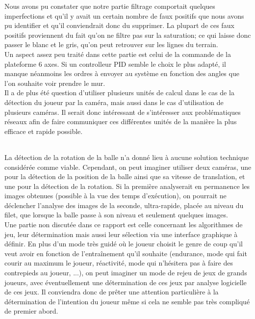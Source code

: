 Nous avons pu constater que notre partie filtrage comportait quelques imperfections et qu'il y avait un certain nombre de faux positifs que nous avons pu identifier et qu'il conviendrait donc du supprimer. La plupart de ces faux positifs proviennent du fait qu'on ne filtre pas sur la saturation; ce qui laisse donc passer le blanc et le gris, qu'on peut retrouver sur les lignes du terrain. \\

Un aspect assez peu traité dans cette partie est celui de la commande de la plateforme 6 axes. Si un controlleur PID semble le choix le plus adapté, il manque néanmoins les ordres à envoyer au système en fonction des angles que l'on souhaite voir prendre le mur. \\


Il a de plus été question d'utiliser plusieurs unités de calcul dans le cas de la détection du joueur par la caméra, mais aussi dans le cas d'utilisation de plusieurs caméras. Il serait donc intéressant de s'intéresser aux problématiques réseaux afin de faire communiquer ces différentes unités de la manière la plus efficace et rapide possible. \\  

La détection de la rotation de la balle n'a donné lieu à aucune solution technique considérée comme viable. Cependant, on peut imaginer utiliser deux caméras, une pour la détection de la position de la balle ainsi que sa vitesse de translation, et une pour la détection de la rotation. Si la première analyserait en permanence les images obtenues (possible à la vue des temps d'exécution), on pourrait ne déclencher l'analyse des images de la seconde,  ultra-rapide, placée au niveau du filet, que lorsque la balle passe à son niveau et seulement quelques images. \\

Une partie non discutée dans ce rapport est celle concernant les algorithmes de jeu, leur détermination mais aussi leur sélection via une interface graphique à définir. En plus d'un mode très guidé où le joueur choisit le genre de coup qu'il veut avoir en fonction de l'entraînement qu'il souhaite (endurance, mode qui fait courir au maximum le joueur, réactivité, mode qui n'hésitera pas à faire des contrepieds au joueur, ...), on peut imaginer un mode de rejeu de jeux de grands joueurs, avec éventuellement une détermination de ces jeux par analyse logicielle de ces jeux. Il conviendra donc de prêter une attention particulière à la détermination de l'intention du joueur même si cela ne semble pas très compliqué de premier abord. \\